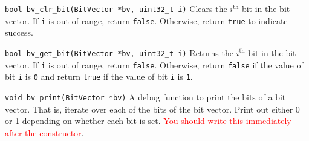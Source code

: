 \begin{funcdoc}{\texttt{bool bv\_clr\_bit(BitVector *bv, uint32\_t i)}}
  Clears the $i^\text{th}$ bit in the bit vector. If \texttt{i} is out
  of range, return \texttt{false}. Otherwise, return \texttt{true} to
  indicate success.
\end{funcdoc}

\begin{funcdoc}{\texttt{bool bv\_get\_bit(BitVector *bv, uint32\_t i)}}
  Returns the $i^\text{th}$ bit in the bit vector. If \texttt{i} is out
  of range, return \texttt{false}. Otherwise, return \texttt{false} if
  the value of bit \texttt{i} is \texttt{0} and return \texttt{true} if
  the value of bit \texttt{i} is \texttt{1}.
\end{funcdoc}

\begin{funcdoc}{\texttt{void bv\_print(BitVector *bv)}}
  A debug function to print the bits of a bit vector. That is, iterate
  over each of the bits of the bit vector. Print out either 0 or 1
  depending on whether each bit is set. \textcolor{red}{You should write
  this immediately after the constructor}.
\end{funcdoc}
